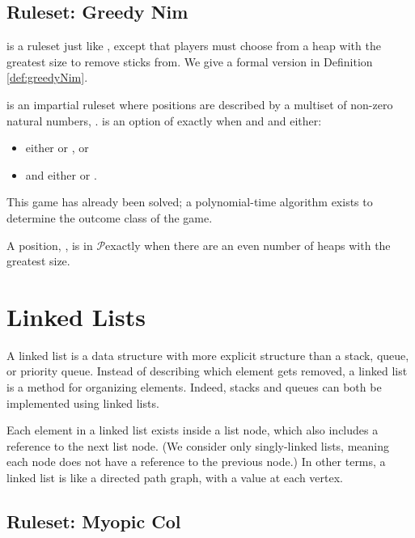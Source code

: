 \documentclass[letter,10pt]{article}
\newcommand{\zero}{\ensuremath{\mathcal{P}}}
\begin{document}
\subsection{Ruleset: Greedy Nim}

 is a ruleset just like , except that players must choose from a heap with the greatest size to remove sticks from\cite{WinningWays:2001}.  We give a formal version in Definition \ref{def:greedyNim}.



\begin{definition}
	\label{def:greedyNim}
	 is an impartial ruleset where positions are described by a multiset of non-zero natural numbers, .   is an option of  exactly when  and  and either:
	\begin{itemize}
		\item  either  or , or
		\item  and  either  or .
	\end{itemize}
\end{definition}

This game has already been solved; a polynomial-time algorithm exists to determine the outcome class of the game\cite{MR2056015}.

\begin{theorem}
	A  position, , is in \zero exactly when there are an even number of heaps with the greatest size.
\end{theorem}

\section{Linked Lists}
\label{section:linkedLists}

A linked list is a data structure with more explicit structure than a stack, queue, or priority queue.  Instead of describing which element gets removed, a linked list is a method for organizing elements.  Indeed, stacks and queues can both be implemented using linked lists.

Each element in a linked list exists inside a list node, which also includes a reference to the next list node.  (We consider only singly-linked lists, meaning each node does not have a reference to the previous node.)  In other terms, a linked list is like a directed path graph, with a value at each vertex.

\subsection{Ruleset: Myopic Col}\label{sec:myopiccol}\label{sec:myopiccol}\label{sec:myopiccol}\label{sec:myopiccol}\label{sec:myopiccol}
\end{document}
